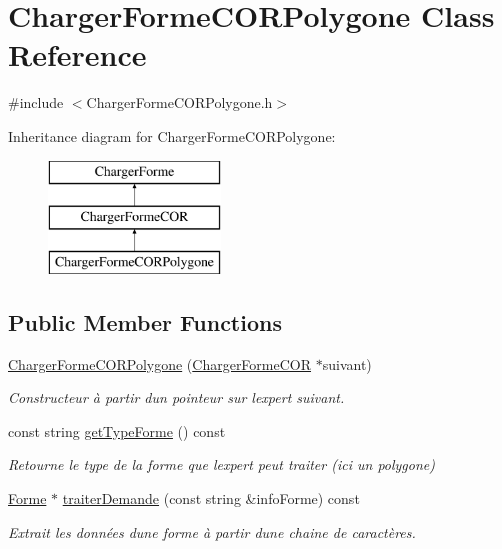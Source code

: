 \hypertarget{class_charger_forme_c_o_r_polygone}{}\section{Charger\+Forme\+C\+O\+R\+Polygone Class Reference}
\label{class_charger_forme_c_o_r_polygone}


{\ttfamily \#include $<$Charger\+Forme\+C\+O\+R\+Polygone.\+h$>$}

Inheritance diagram for Charger\+Forme\+C\+O\+R\+Polygone\+:\begin{figure}[H]
\begin{center}
\leavevmode
\includegraphics[height=3.000000cm]{class_charger_forme_c_o_r_polygone}
\end{center}
\end{figure}
\subsection*{Public Member Functions}
\begin{DoxyCompactItemize}
\item 
\hyperlink{class_charger_forme_c_o_r_polygone_a177c7353e9c065436dda08540c675b23}{Charger\+Forme\+C\+O\+R\+Polygone} (\hyperlink{class_charger_forme_c_o_r}{Charger\+Forme\+C\+OR} $\ast$suivant)
\begin{DoxyCompactList}\small\item\em Constructeur à partir d\textquotesingle{}un pointeur sur l\textquotesingle{}expert suivant. \end{DoxyCompactList}\item 
const string \hyperlink{class_charger_forme_c_o_r_polygone_a8e702295e28572dc41020965255b847a}{get\+Type\+Forme} () const
\begin{DoxyCompactList}\small\item\em Retourne le type de la forme que l\textquotesingle{}expert peut traiter (ici un polygone) \end{DoxyCompactList}\item 
\hyperlink{class_forme}{Forme} $\ast$ \hyperlink{class_charger_forme_c_o_r_polygone_a4ce89ecdaa400d4930743a8e7204b5f2}{traiter\+Demande} (const string \&info\+Forme) const
\begin{DoxyCompactList}\small\item\em Extrait les données d\textquotesingle{}une forme à partir d\textquotesingle{}une chaine de caractères. \end{DoxyCompactList}\end{DoxyCompactItemize}
